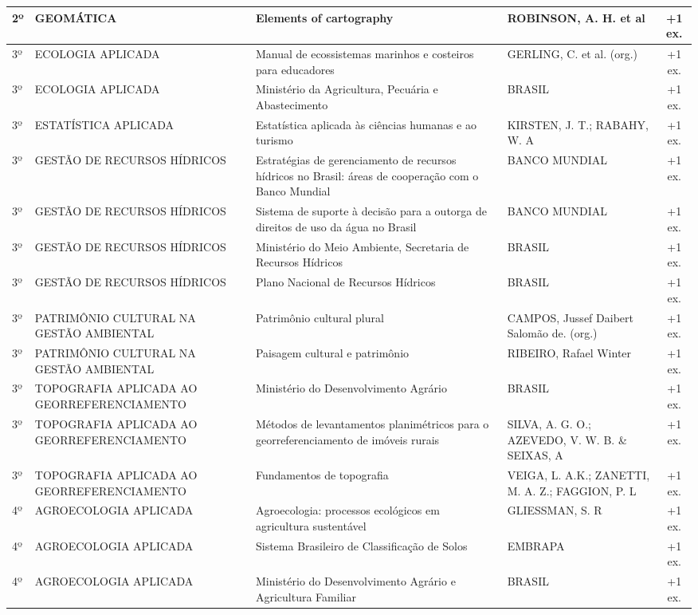 \documentclass[11pt,a4paper]{article}
\begin{document}
\begin{longtable}{|p{1.2cm}|p{3.5cm}|p{6cm}|p{3.5cm}|c|}
2º & GEOMÁTICA & Elements of cartography & ROBINSON, A. H. et al & +1 ex. \\ \hline
3º & ECOLOGIA APLICADA & Manual de ecossistemas marinhos e costeiros para educadores & GERLING, C. et al. (org.) & +1 ex. \\ \hline
3º & ECOLOGIA APLICADA & Ministério da Agricultura, Pecuária e Abastecimento & BRASIL & +1 ex. \\ \hline
3º & ESTATÍSTICA APLICADA & Estatística aplicada às ciências humanas e ao turismo & KIRSTEN, J. T.; RABAHY, W. A & +1 ex. \\ \hline
3º & GESTÃO DE RECURSOS HÍDRICOS & Estratégias de gerenciamento de recursos hídricos no Brasil: áreas de cooperação com o Banco Mundial & BANCO MUNDIAL & +1 ex. \\ \hline
3º & GESTÃO DE RECURSOS HÍDRICOS & Sistema de suporte à decisão para a outorga de direitos de uso da água no Brasil & BANCO MUNDIAL & +1 ex. \\ \hline
3º & GESTÃO DE RECURSOS HÍDRICOS & Ministério do Meio Ambiente, Secretaria de Recursos Hídricos & BRASIL & +1 ex. \\ \hline
3º & GESTÃO DE RECURSOS HÍDRICOS & Plano Nacional de Recursos Hídricos & BRASIL & +1 ex. \\ \hline
3º & PATRIMÔNIO CULTURAL NA GESTÃO AMBIENTAL & Patrimônio cultural plural & CAMPOS, Jussef Daibert Salomão de. (org.) & +1 ex. \\ \hline
3º & PATRIMÔNIO CULTURAL NA GESTÃO AMBIENTAL & Paisagem cultural e patrimônio & RIBEIRO, Rafael Winter & +1 ex. \\ \hline
3º & TOPOGRAFIA APLICADA AO GEORREFERENCIAMENTO & Ministério do Desenvolvimento Agrário & BRASIL & +1 ex. \\ \hline
3º & TOPOGRAFIA APLICADA AO GEORREFERENCIAMENTO & Métodos de levantamentos planimétricos para o georreferenciamento de imóveis rurais & SILVA, A. G. O.; AZEVEDO, V. W. B. \& SEIXAS, A & +1 ex. \\ \hline
3º & TOPOGRAFIA APLICADA AO GEORREFERENCIAMENTO & Fundamentos de topografia & VEIGA, L. A.K.; ZANETTI, M. A. Z.; FAGGION, P. L & +1 ex. \\ \hline
4º & AGROECOLOGIA APLICADA & Agroecologia: processos ecológicos em agricultura sustentável & GLIESSMAN, S. R & +1 ex. \\ \hline
4º & AGROECOLOGIA APLICADA & Sistema Brasileiro de Classificação de Solos & EMBRAPA & +1 ex. \\ \hline
4º & AGROECOLOGIA APLICADA & Ministério do Desenvolvimento Agrário e Agricultura Familiar & BRASIL & +1 ex. \\ \hline

\end{longtable}
\end{document}

